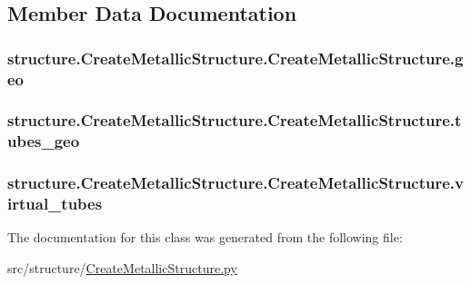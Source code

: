 \subsection{Member Data Documentation}
\hypertarget{classstructure_1_1_create_metallic_structure_1_1_create_metallic_structure_aa80f203a5ab4d5dfae33a718fa1285c6}{
\subsubsection[{geo}]{\setlength{\rightskip}{0pt plus 5cm}structure.\-Create\-Metallic\-Structure.\-Create\-Metallic\-Structure.\-geo}}\label{classstructure_1_1_create_metallic_structure_1_1_create_metallic_structure_aa80f203a5ab4d5dfae33a718fa1285c6}
\hypertarget{classstructure_1_1_create_metallic_structure_1_1_create_metallic_structure_ac92522654a56c4d4a91fd5b2f3be23e7}{
\subsubsection[{tubes\-\_\-geo}]{\setlength{\rightskip}{0pt plus 5cm}structure.\-Create\-Metallic\-Structure.\-Create\-Metallic\-Structure.\-tubes\-\_\-geo}}\label{classstructure_1_1_create_metallic_structure_1_1_create_metallic_structure_ac92522654a56c4d4a91fd5b2f3be23e7}
\hypertarget{classstructure_1_1_create_metallic_structure_1_1_create_metallic_structure_a2ce97b05962c83c3ac7d15c8c1c41f61}{
\subsubsection[{virtual\-\_\-tubes}]{\setlength{\rightskip}{0pt plus 5cm}structure.\-Create\-Metallic\-Structure.\-Create\-Metallic\-Structure.\-virtual\-\_\-tubes}}\label{classstructure_1_1_create_metallic_structure_1_1_create_metallic_structure_a2ce97b05962c83c3ac7d15c8c1c41f61}


The documentation for this class was generated from the following file\-:\begin{DoxyCompactItemize}
\item 
src/structure/\hyperlink{_create_metallic_structure_8py}{Create\-Metallic\-Structure.\-py}\end{DoxyCompactItemize}
